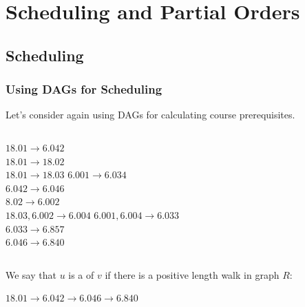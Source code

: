 \section{Scheduling and Partial Orders}


\subsection{Scheduling}

\begin{frame}
  \frametitle{Using DAGs for Scheduling}

  Let's consider again using DAGs for calculating course prerequisites.\medskip

  \begin{columns}[T]
    $18.01 \rightarrow 6.042$\\
    $18.01 \rightarrow 18.02$\\
    $18.01 \rightarrow 18.03$
    $6.001 \rightarrow 6.034$\\
    $6.042 \rightarrow 6.046$\\
    $8.02 \rightarrow 6.002$\\
    $18.03, 6.002 \rightarrow 6.004$
    $6.001, 6.004 \rightarrow 6.033$\\
    $6.033 \rightarrow 6.857$\\
    $6.046 \rightarrow 6.840$
  \end{columns}

  \vfill

  We say that $u$ is a  of $v$ if there is a positive length walk in graph $R$:

    \begin{center}
      $18.01 \rightarrow 6.042 \rightarrow 6.046 \rightarrow 6.840$
    \end{center}
\end{frame}



